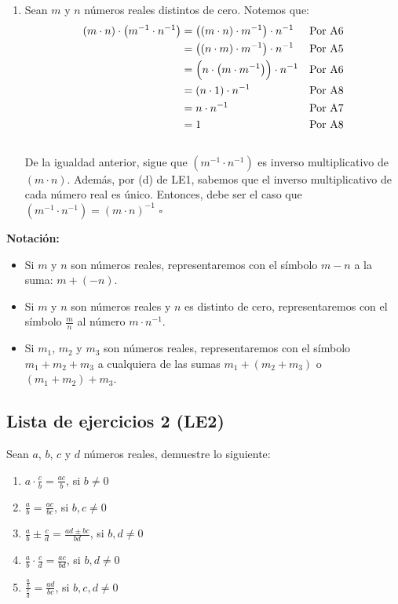 \documentclass[11pt]{article}
\begin{document}
\begin{enumerate}[label=\alph*), font=\bfseries]
    \item Sean $m$ y $n$ números reales distintos de cero. Notemos que:
    \begin{align*}
        \left(m \cdot n \right) \cdot  \left(m^{-1} \cdot n^{-1}  \right)	&=	 \left( \left(m \cdot n \right) \cdot m^{-1}  \right) \cdot n^{-1}  	&& \text{Por A6}\\
    &=	 \left( \left(n \cdot m \right) \cdot m^{-1}  \right) \cdot n^{-1}  	&& \text{Por A5}\\
    &=	 \Bigl(n \cdot  \left(m \cdot m^{-1}\right) \Bigr) \cdot n^{-1}	&& \text{Por A6}\\
    &=	 \left(n \cdot 1 \right) \cdot n^{-1}	&& \text{Por A8}\\
    &=	n \cdot n^{-1}	&& \text{Por A7}\\
    &=	1	&& \text{Por A8}
    \end{align*} \\
    De la igualdad anterior, sigue que $\left(m^{-1} \cdot n^{-1} \right)$ es inverso multiplicativo de $\left( m \cdot n \right)$. Además, por (d) de LE1, sabemos que el inverso multiplicativo de cada número real es único. Entonces, debe ser el caso que $\left(m^{-1} \cdot n^{-1} \right) = \left( m \cdot n \right)^{-1}$ \mbox{}\hfill $\square$
\end{enumerate}

\textbf{Notación:}

\begin{itemize}
    \item Si $m$ y $n$ son números reales, representaremos con el símbolo $m-n$ a la suma: $m+ (-n)$.
    \item Si $m$ y $n$ son números reales y $n$ es distinto de cero, representaremos con el símbolo $ \frac{m}{n}$ al número $m \cdot n^{-1} $.
    \item Si $m_1$, $m_2$ y $m_3$ son números reales, representaremos con el símbolo $m_1+m_2+ m_3$ a cualquiera de las sumas $m_1+ \left(m_2+ m_3 \right)$ o $\left(m_1+ m_2 \right)+ m_3$.
\end{itemize}


\subsection*{Lista de ejercicios 2 (LE2)}

Sean $a$, $b$, $c$ y $d$ números reales, demuestre lo siguiente:

\begin{enumerate}[label=\alph*),font=\bfseries]
    \item $a \cdot \frac{c}{b} = \frac{ac}{b}$, si $b \neq 0$
    \item $\frac{a}{b} = \frac{ac}{bc}$, si $b,c \neq 0$
    \item $\frac{a}{b} \pm \frac{c}{d} = \frac{ad \pm bc}{bd} $, si $b, d \neq 0$
    \item $\frac{a}{b} \cdot \frac{c}{d} = \frac{ac}{bd}$, si $b, d \neq 0$
    \item $\frac{\frac{a}{b}}{\frac{c}{d}} = \frac{ad}{bc}$, si $b, c, d \neq 0$
\end{enumerate}
\end{document}
